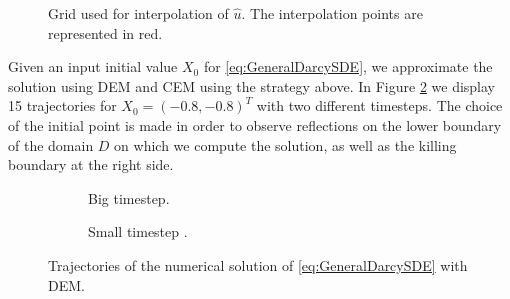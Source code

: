 \begin{figure}[t]
    \centering
    \resizebox{0.8\linewidth}{!}{ }  
    \caption{Grid used for interpolation of $\hat{u}$. The interpolation points are represented in red.}
    \label{fig:GridVelocity}
\end{figure}
\noindent Given an input initial value $X_0$ for \eqref{eq:GeneralDarcySDE}, we approximate the solution using DEM and CEM using the strategy above. In Figure \ref{fig:TrajSDEDarcy} we display 15 trajectories for $X_0 = (-0.8,-0.8)^T$ with two different timesteps. The choice of the initial point is made in order to observe reflections on the lower boundary of the domain $D$ on which we compute the solution, as well as the killing boundary at the right side. 

\begin{figure}[t]
    \centering
    \begin{subfigure}{0.49\linewidth}
        \centering
        \resizebox{1\linewidth}{!}{ }  
        \caption{Big timestep.}
    \end{subfigure}
    \begin{subfigure}{0.49\linewidth}
        \centering
        \resizebox{1\linewidth}{!}{ }  
        \caption{Small timestep .}
    \end{subfigure}    
    \caption{Trajectories of the numerical solution of \eqref{eq:GeneralDarcySDE} with DEM.}
    \label{fig:TrajSDEDarcy}
\end{figure}

